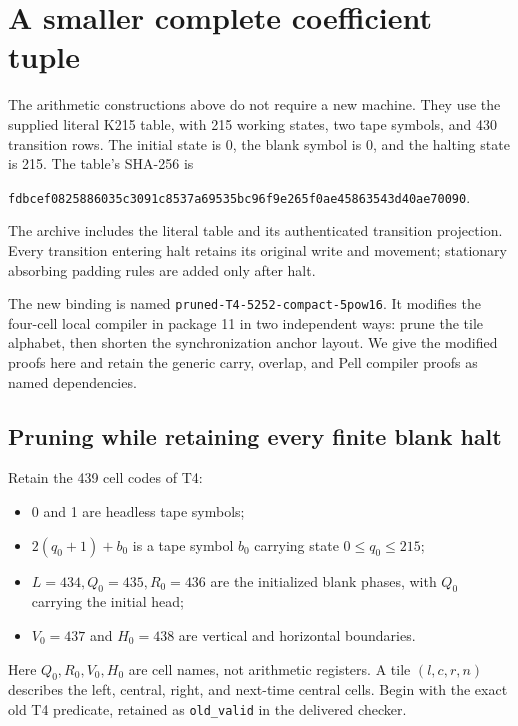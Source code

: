 \section{A smaller complete coefficient tuple}
\label{sec:compiler}

The arithmetic constructions above do not require a new machine.
They use the supplied literal K215 table, with 215 working states,
two tape symbols, and 430 transition rows.  The initial state is 0,
the blank symbol is 0, and the halting state is 215.  The table's
SHA-256 is
\begin{center}\scriptsize
\texttt{fdbcef0825886035c3091c8537a69535bc96f9e265f0ae45863543d40ae70090}.
\end{center}
The archive includes the literal table and its authenticated transition
projection.  Every transition entering halt retains its original write
and movement; stationary absorbing padding rules are added only after
halt.

The new binding is named
\texttt{pruned-T4-5252-compact-5pow16}.
It modifies the four-cell local compiler in package 11 \cite{RepoT4} in two
independent ways: prune the tile alphabet, then shorten the synchronization
anchor layout.  We give the modified proofs here and retain the generic
carry, overlap, and Pell compiler proofs as named dependencies.

\subsection{Pruning while retaining every finite blank halt}

Retain the 439 cell codes of T4:
\begin{itemize}
\item 0 and 1 are headless tape symbols;
\item $2(q_0+1)+b_0$ is a tape symbol $b_0$ carrying state
      $0\le q_0\le215$;
\item $L=434,Q_0=435,R_0=436$ are the initialized blank phases,
      with $Q_0$ carrying the initial head;
\item $V_0=437$ and $H_0=438$ are vertical and horizontal boundaries.
\end{itemize}
Here $Q_0,R_0,V_0,H_0$ are cell names, not arithmetic registers.
A tile $(l,c,r,n)$ describes the left, central, right, and next-time
central cells.  Begin with the exact old T4 predicate, retained as
\texttt{old\_valid} in the delivered checker.

